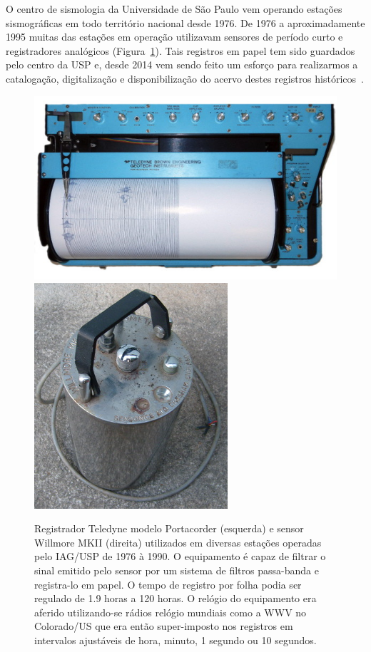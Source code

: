 \documentclass{article}
\begin{document}
O centro de sismologia da Universidade de São Paulo vem operando
estações sismográficas em todo território nacional desde 1976. De 1976
a aproximadamente 1995 muitas das estações em operação utilizavam
sensores de período curto e registradores analógicos (Figura~\ref{teledyne}). Tais
registros em papel tem sido guardados pelo centro da USP e, desde 2014
vem sendo feito um esforço para realizarmos a catalogação,
digitalização e disponibilização do acervo destes registros
históricos~\cite{dados-raros}.
\begin{figure}
\begin{center}
\includegraphics[scale=0.35]{registrador.png}
\includegraphics[scale=0.35]{sensor.png}
\end{center}
\label{teledyne}
\caption{Registrador Teledyne modelo Portacorder (esquerda) e sensor
  Willmore MKII (direita) utilizados em diversas estações operadas
  pelo IAG/USP de 1976 à 1990. O equipamento é capaz de filtrar o
  sinal emitido pelo sensor por um sistema de filtros passa-banda e
  registra-lo em papel. O tempo de registro por folha podia ser
  regulado de 1.9 horas a 120 horas. O relógio do equipamento era
  aferido utilizando-se rádios relógio mundiais como a WWV no
  Colorado/US que era então super-imposto nos registros em intervalos
  ajustáveis de hora, minuto, 1 segundo ou 10 segundos.}
\end{figure}
\end{document}

